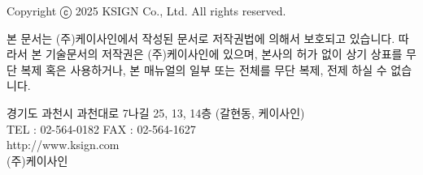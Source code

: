 \clearpage
\thispagestyle{fancy}

\vspace*{3cm}

\vfill

{\footnotesize
\noindent
\begin{minipage}{0.58\textwidth}
Copyright ⓒ 2025 KSIGN Co., Ltd. All rights reserved.

본 문서는 (주)케이사인에서 작성된 문서로 저작권법에 의해서 보호되고 있습니다. 따라서 본 기술문서의 저작권은 (주)케이사인에 있으며, 본사의 허가 없이 상기 상표를 무단 복제 혹은 사용하거나, 본 매뉴얼의 일부 또는 전체를 무단 복제, 전제 하실 수 없습니다.

\vspace{0.8em}

경기도 과천시 과천대로 7나길 25, 13, 14층 (갈현동, 케이사인)\\
TEL : 02-564-0182 \quad FAX : 02-564-1627\\
http://www.ksign.com\\
(주)케이사인
\end{minipage}
}


\vspace{10mm}
